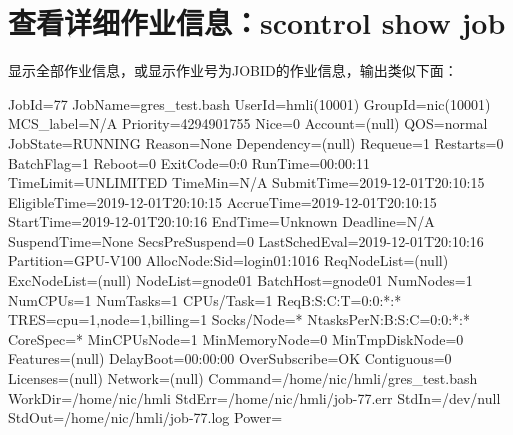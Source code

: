 
\section{查看详细作业信息：scontrol show job}
显示全部作业信息，或显示作业号为JOBID的作业信息，输出类似下面：
\begin{OUT}
JobId=77 JobName=gres_test.bash
   UserId=hmli(10001) GroupId=nic(10001) MCS_label=N/A
   Priority=4294901755 Nice=0 Account=(null) QOS=normal
   JobState=RUNNING Reason=None Dependency=(null)
   Requeue=1 Restarts=0 BatchFlag=1 Reboot=0 ExitCode=0:0
   RunTime=00:00:11 TimeLimit=UNLIMITED TimeMin=N/A
   SubmitTime=2019-12-01T20:10:15 EligibleTime=2019-12-01T20:10:15
   AccrueTime=2019-12-01T20:10:15
   StartTime=2019-12-01T20:10:16 EndTime=Unknown Deadline=N/A
   SuspendTime=None SecsPreSuspend=0 LastSchedEval=2019-12-01T20:10:16
   Partition=GPU-V100 AllocNode:Sid=login01:1016
   ReqNodeList=(null) ExcNodeList=(null)
   NodeList=gnode01
   BatchHost=gnode01
   NumNodes=1 NumCPUs=1 NumTasks=1 CPUs/Task=1 ReqB:S:C:T=0:0:*:*
   TRES=cpu=1,node=1,billing=1
   Socks/Node=* NtasksPerN:B:S:C=0:0:*:* CoreSpec=*
   MinCPUsNode=1 MinMemoryNode=0 MinTmpDiskNode=0
   Features=(null) DelayBoot=00:00:00
   OverSubscribe=OK Contiguous=0 Licenses=(null) Network=(null)
   Command=/home/nic/hmli/gres_test.bash
   WorkDir=/home/nic/hmli
   StdErr=/home/nic/hmli/job-77.err
   StdIn=/dev/null
   StdOut=/home/nic/hmli/job-77.log
   Power=
\end{OUT}

